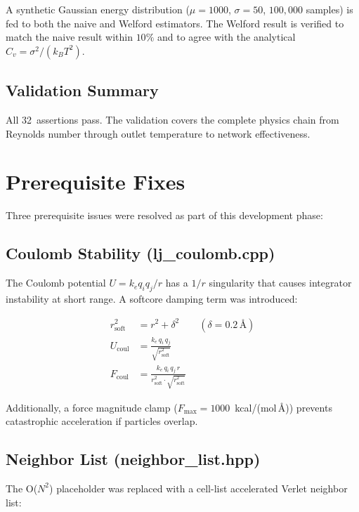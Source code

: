 \documentclass[11pt]{article}
\begin{document}
A synthetic Gaussian energy distribution ($\mu = 1000$, $\sigma = 50$,
$100{,}000$ samples) is fed to both the naive and Welford estimators.
The Welford result is verified to match the naive result within $10\%$
and to agree with the analytical $C_v = \sigma^2 / (k_B T^2)$.

\subsection{Validation Summary}

All 32~assertions pass.  The validation covers the complete physics chain
from Reynolds number through outlet temperature to network effectiveness.

\section{Prerequisite Fixes}

Three prerequisite issues were resolved as part of this development phase:

\subsection{Coulomb Stability (lj\_coulomb.cpp)}

The Coulomb potential $U = k_e q_i q_j / r$ has a $1/r$ singularity that
causes integrator instability at short range.  A softcore damping term was
introduced:

\begin{align}
  r_{\text{soft}}^2 &= r^2 + \delta^2 \qquad (\delta = 0.2\,\text{\AA}) \\
  U_{\text{coul}} &= \frac{k_e \, q_i \, q_j}{\sqrt{r_{\text{soft}}^2}} \\
  F_{\text{coul}} &= \frac{k_e \, q_i \, q_j \, r}{r_{\text{soft}}^2 \cdot \sqrt{r_{\text{soft}}^2}}
\end{align}

Additionally, a force magnitude clamp ($F_{\max} = 1000$~kcal/(mol\,\AA))
prevents catastrophic acceleration if particles overlap.

\subsection{Neighbor List (neighbor\_list.hpp)}

The O($N^2$) placeholder was replaced with a cell-list accelerated Verlet
neighbor list:
\end{document}
